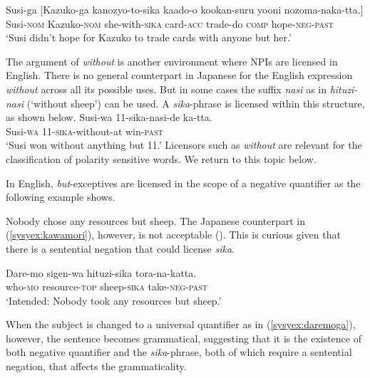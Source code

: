 \documentclass[output=paper,colorlinks,citecolor=brown,
]{langscibook}
\def\refp#1{(\ref{sy#1})}
\def\M#1{\textsc{#1}}
\begin{document}

\ea \gll Susi-ga [Kazuko-ga kanozyo-to-sika kaado-o kookan-suru yooni nozoma-naka-tta.]\\
Susi-\M{nom} Kazuko-\M{nom} she-with-\M{sika} card-\M{acc} trade-do \M{comp} hope-\M{neg}-\M{past}\\
\glt `Susi didn't hope for Kazuko to trade cards with anyone but her.'\z


The argument of \emph{without} is another environment where NPIs are licensed in English.
There is no general counterpart in Japanese for the English expression \textit{without} across all its possible uses.  But in some cases the suffix \emph{nasi} as in \emph{hituzi-nasi} (`without sheep') can be used.  A \emph{sika}-phrase is licensed within this structure, as shown below.
\ea \label{syex:nasi}
    \gll Susi-wa 11-sika-nasi-de ka-tta.\\
        Susi-\M{wa} 11-\M{sika}-without-at  win-\M{past}\\
    \glt    `Susi won without anything but 11.'\z
%       
Licensors such as \emph{without} are relevant for the classification of polarity sensitive words.  We return to this topic below.

In English, \emph{but}-exceptives are licensed in the scope of a negative quantifier as the following example shows. 

\ea Nobody chose any resources but sheep.\z
%
The Japanese counterpart in \refp{syex:kawamori}, however, is not acceptable (\citealt{kawamori01a}). This is curious given that there is a sentential negation that could license \emph{sika}. 

\ea \label{syex:kawamori}
\gll *Dare-mo sigen-wa hituzi-sika tora-na-katta.\\
who-\M{mo} resource-\M{top} sheep-\M{sika} take-\M{neg-past}\\
\glt `Intended: Nobody took any resources but sheep.' \z

When the subject is changed to a universal quantifier as in \refp{syex:daremoga}, however, the sentence becomes grammatical, suggesting that it is the existence of both negative quantifier and the \emph{sika}-phrase, both of which require a sentential negation, that affects the grammaticality.
\end{document}
